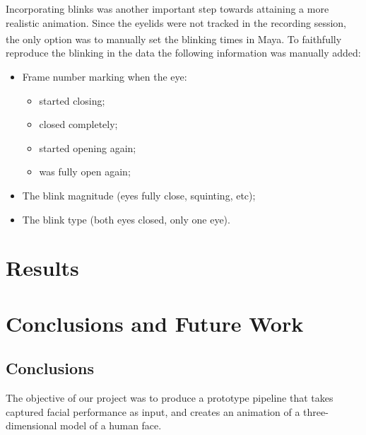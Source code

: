 \documentclass[11pt]{report}
\newcommand{\Maya}{Maya\textsuperscript\textregistered}
\begin{document}
Incorporating blinks was another important step towards attaining a more realistic animation.
Since the eyelids were not tracked in the recording session, the only option was to manually set the blinking times in \Maya.
To faithfully reproduce the blinking in the data the following information was manually added:
\begin{itemize}
\item Frame number marking when the eye:
	\begin{itemize}
	\item started closing;
	\item closed completely;
	\item started opening again;
	\item was fully open again;
	\end{itemize}
\item The blink magnitude (eyes fully close, squinting, etc);
\item The blink type (both eyes closed, only one eye).
\end{itemize}

\chapter{Results}




\chapter{Conclusions and Future Work}
\section{Conclusions}
The objective of our project was to produce a prototype pipeline that takes captured facial performance as input, and creates an animation of a three-dimensional model of a human face. 
\end{document}

